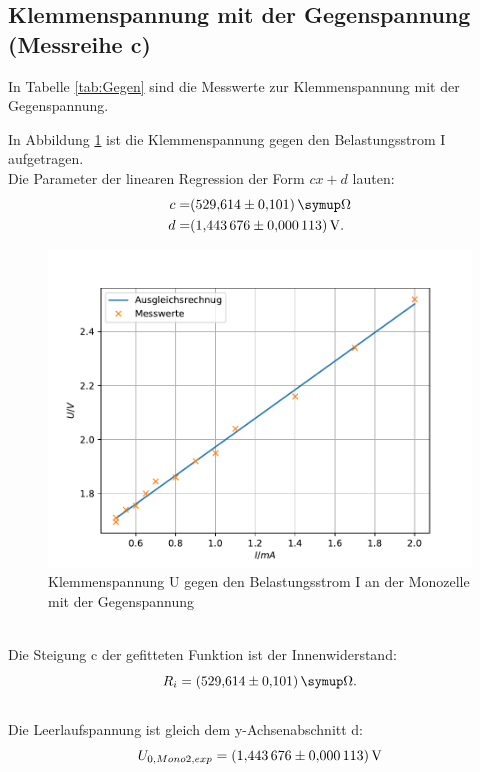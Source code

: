 \subsection{Klemmenspannung mit der Gegenspannung (Messreihe c)}
In Tabelle \ref{tab:Gegen} sind die Messwerte zur Klemmenspannung mit der Gegenspannung.

In Abbildung \ref{fig:Gegen} ist die Klemmenspannung gegen den Belastungsstrom I aufgetragen.
\\Die Parameter der linearen Regression der Form $cx+d$ lauten:
\begin{align*}
c=& \SI{529.614 \pm 0.101}{\symup\Omega}\\
d=& \SI{1.443676 \pm 0.000113}{V}.\\
\end{align*}
\begin{figure}[h!]
  \centering
  \includegraphics[width=\textwidth]{Gegen.pdf}
  \caption{Klemmenspannung U gegen den Belastungsstrom I an der Monozelle mit der Gegenspannung}
  \label{fig:Gegen}
\end{figure}
\\Die Steigung c der gefitteten Funktion ist der Innenwiderstand:
\begin{equation*}
  R_{i}= \SI{529.614 \pm 0.101}{\symup\Omega}.
\end{equation*}
\\Die Leerlaufspannung ist gleich dem y-Achsenabschnitt d:
\begin{equation*}
  U_{0, Mono2, exp}=\SI{1.443676 \pm 0.000113}{V}
\end{equation*}
\FloatBarrier

